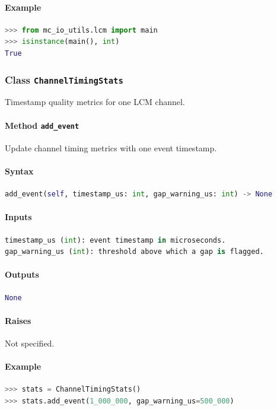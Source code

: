 \documentclass[11pt]{article}
\begin{document}
\paragraph{Example}
\begin{lstlisting}[language=Python]
>>> from mc_io_utils.lcm import main
>>> isinstance(main(), int)
True
\end{lstlisting}

\subsubsection{Class \texttt{ChannelTimingStats}}
Timestamp quality metrics for one LCM channel.

\paragraph{Method \texttt{add\_event}}
Update channel timing metrics with one event timestamp.

\paragraph{Syntax}
\begin{lstlisting}[language=Python]
add_event(self, timestamp_us: int, gap_warning_us: int) -> None
\end{lstlisting}
\paragraph{Inputs}
\begin{lstlisting}[language=Python]
timestamp_us (int): event timestamp in microseconds.
gap_warning_us (int): threshold above which a gap is flagged.
\end{lstlisting}
\paragraph{Outputs}
\begin{lstlisting}[language=Python]
None
\end{lstlisting}
\paragraph{Raises}
Not specified.
\paragraph{Example}
\begin{lstlisting}[language=Python]
>>> stats = ChannelTimingStats()
>>> stats.add_event(1_000_000, gap_warning_us=500_000)
\end{lstlisting}
\end{document}
